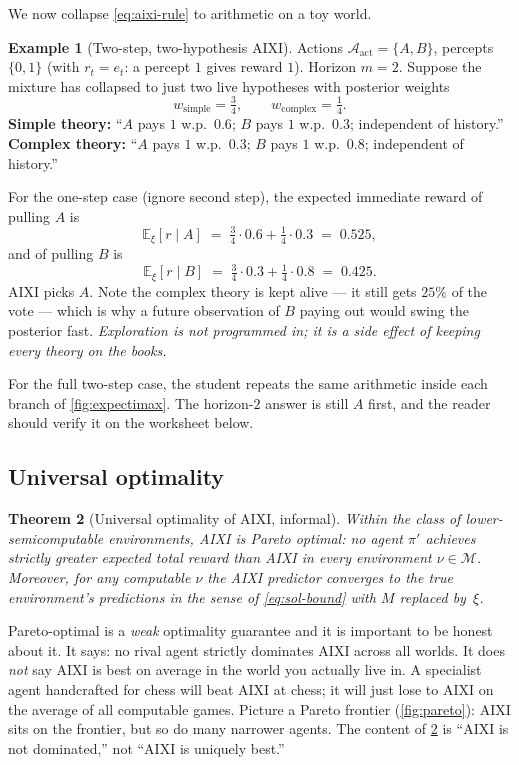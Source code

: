 \documentclass[12pt,a4paper]{article}
\theoremstyle{plain}
\newtheorem{theorem}{Theorem}[section]
\theoremstyle{definition}
\newtheorem{example}[theorem]{Example}
\begin{document}
We now collapse \eqref{eq:aixi-rule} to arithmetic on a toy world.

\begin{example}[Two-step, two-hypothesis AIXI]
\label{ex:aixi-hand}
Actions $\mathcal{A}_{\mathrm{act}}=\{A,B\}$, percepts $\{0,1\}$ (with
$r_t = e_t$: a percept $1$ gives reward $1$).  Horizon $m=2$.  Suppose
the mixture has collapsed to just two live hypotheses with posterior
weights
\[
  w_{\mathrm{simple}}=\tfrac{3}{4},\qquad w_{\mathrm{complex}}=\tfrac{1}{4}.
\]
\textbf{Simple theory:} ``$A$ pays $1$ w.p.\ $0.6$; $B$ pays $1$ w.p.\
$0.3$; independent of history.''
\textbf{Complex theory:} ``$A$ pays $1$ w.p.\ $0.3$; $B$ pays $1$ w.p.\
$0.8$; independent of history.''

For the one-step case (ignore second step), the expected immediate
reward of pulling $A$ is
\[
  \mathbb{E}_\xi[r \mid A]
  \;=\; \tfrac{3}{4}\cdot 0.6 + \tfrac{1}{4}\cdot 0.3
  \;=\; 0.525,
\]
and of pulling $B$ is
\[
  \mathbb{E}_\xi[r \mid B]
  \;=\; \tfrac{3}{4}\cdot 0.3 + \tfrac{1}{4}\cdot 0.8
  \;=\; 0.425.
\]
AIXI picks $A$.  Note the complex theory is kept alive --- it still
gets $25\%$ of the vote --- which is why a future observation of $B$
paying out would swing the posterior fast.  \emph{Exploration is not
programmed in; it is a side effect of keeping every theory on the
books.}

For the full two-step case, the student repeats the same arithmetic
inside each branch of \cref{fig:expectimax}.  The horizon-$2$ answer
is still $A$ first, and the reader should verify it on the worksheet
below.
\end{example}

\subsection*{Universal optimality}

\begin{theorem}[Universal optimality of AIXI, informal]
\label{thm:aixi-opt}
Within the class of lower-semicomputable environments, AIXI is
\emph{Pareto optimal}: no agent $\pi'$ achieves strictly greater
expected total reward than AIXI in \emph{every} environment $\nu \in
\mathcal{M}$.  Moreover, for any computable $\nu$ the AIXI predictor
converges to the true environment's predictions in the sense of
\eqref{eq:sol-bound} with $M$ replaced by~$\xi$.
\end{theorem}

\begin{intuition}
Pareto-optimal is a \emph{weak} optimality guarantee and it is
important to be honest about it.  It says: no rival agent strictly
dominates AIXI across all worlds.  It does \emph{not} say AIXI is best
on average in the world you actually live in.  A specialist agent
handcrafted for chess will beat AIXI at chess; it will just lose to
AIXI on the average of all computable games.  Picture a
Pareto frontier (\cref{fig:pareto}): AIXI sits on the frontier, but so
do many narrower agents.  The content of \cref{thm:aixi-opt} is
``AIXI is not dominated,'' not ``AIXI is uniquely best.''
\end{intuition}
\end{document}
